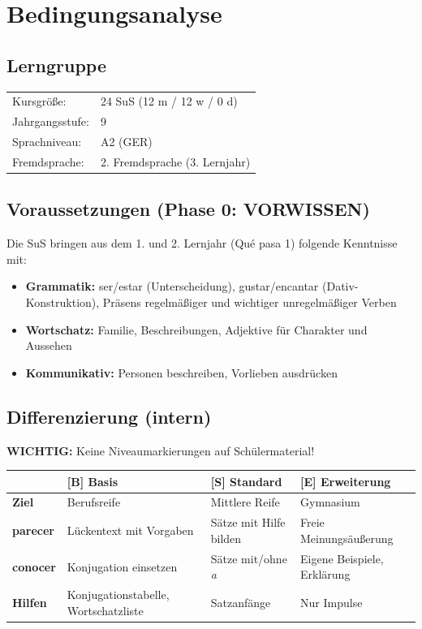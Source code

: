 \documentclass[11pt,a4paper]{article}
\newcommand{\jahrgangsstufe}{9}
\newcommand{\gerniveau}{A2}
\newcommand{\lerngruppengroesse}{24}
\newcommand{\maennlich}{12}
\newcommand{\weiblich}{12}
\newcommand{\divers}{0}
\begin{document}
\section{Bedingungsanalyse}

\subsection{Lerngruppe}
\begin{tabular}{ll}
    Kursgröße: & \lerngruppengroesse{} SuS (\maennlich{} m / \weiblich{} w / \divers{} d) \\
    Jahrgangsstufe: & \jahrgangsstufe \\
    Sprachniveau: & \gerniveau{} (GER) \\
    Fremdsprache: & 2. Fremdsprache (3. Lernjahr) \\
\end{tabular}

\subsection{Voraussetzungen (Phase 0: VORWISSEN)}
Die SuS bringen aus dem 1. und 2. Lernjahr (Qué pasa 1) folgende Kenntnisse mit:
\begin{itemize}
    \item \textbf{Grammatik:} ser/estar (Unterscheidung), gustar/encantar (Dativ-Konstruktion), Präsens regelmäßiger und wichtiger unregelmäßiger Verben
    \item \textbf{Wortschatz:} Familie, Beschreibungen, Adjektive für Charakter und Aussehen
    \item \textbf{Kommunikativ:} Personen beschreiben, Vorlieben ausdrücken
\end{itemize}

\subsection{Differenzierung (intern)}

\textbf{WICHTIG:} Keine Niveaumarkierungen auf Schülermaterial!

\begin{tabular}{|l|p{3.5cm}|p{3.5cm}|p{3.5cm}|}
\hline
& \textcolor{basisgreen}{\textbf{[B] Basis}} & \textcolor{standardblue}{\textbf{[S] Standard}} & \textcolor{erweiterungpurple}{\textbf{[E] Erweiterung}} \\
\hline
\textbf{Ziel} & Berufsreife & Mittlere Reife & Gymnasium \\
\hline
\textbf{parecer} & Lückentext mit Vorgaben & Sätze mit Hilfe bilden & Freie Meinungsäußerung \\
\hline
\textbf{conocer} & Konjugation einsetzen & Sätze mit/ohne \textit{a} & Eigene Beispiele, Erklärung \\
\hline
\textbf{Hilfen} & Konjugationstabelle, Wortschatzliste & Satzanfänge & Nur Impulse \\
\hline
\end{tabular}
\end{document}
